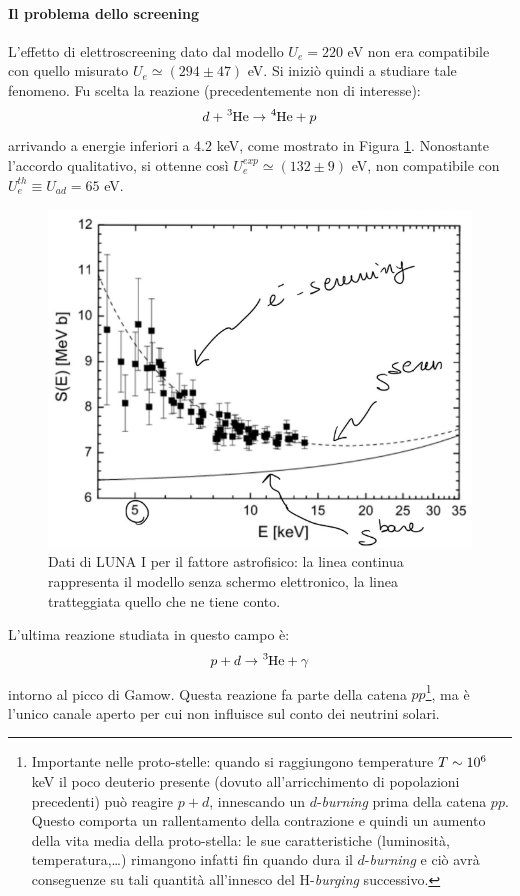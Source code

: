 \paragraph{Il problema dello screening} L'effetto di elettroscreening dato dal modello $U_e = 220$ eV non era compatibile con quello misurato $U_e\simeq (294 \pm 47)$ eV. Si iniziò quindi a studiare tale fenomeno. Fu scelta la reazione (precedentemente non di interesse):
$$d + \ce{^3He} \to \ce{^4He} + p$$
arrivando a energie inferiori a $4.2$ keV, come mostrato in Figura \ref{0415_escreen}. Nonostante l'accordo qualitativo, si ottenne così $U_e^{exp} \simeq (132\pm 9) $ eV, non compatibile con $U_e^{th}\equiv U_{ad} = 65$ eV.

\begin{figure}[!h]
	\centering
	\includegraphics[scale=0.7]{Immagini/0415_SE.png}
	\caption{Dati di LUNA I per il fattore astrofisico: la linea continua rappresenta il modello senza schermo elettronico, la linea tratteggiata quello che ne tiene conto.}
	\label{0415_escreen}
\end{figure}
\noindent L'ultima reazione studiata in questo campo è:
$$p + d \to \ce{^3He} + \gamma$$
intorno al picco di Gamow. Questa reazione fa parte della catena $pp$\footnote{Importante nelle proto-stelle: quando si raggiungono temperature $T\sim 10^{6}$ keV il poco deuterio presente (dovuto all'arricchimento di popolazioni precedenti) può reagire $p+d$, innescando un $d$-\textit{burning} prima della catena $pp$. Questo comporta un rallentamento della contrazione e quindi un aumento della vita media della proto-stella: le sue caratteristiche (luminosità, temperatura,\dots) rimangono infatti  fin quando dura il $d$-\textit{burning} e ciò avrà conseguenze su tali quantità all'innesco del H-\textit{burging} successivo.}, ma è l'unico canale aperto per cui non influisce sul conto dei neutrini solari. 
